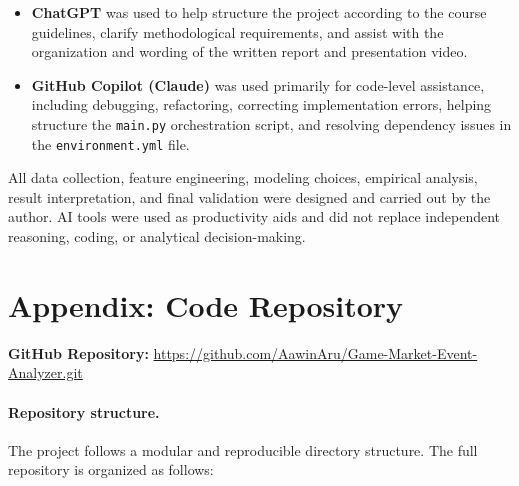 \documentclass[11pt,a4paper]{article}
\begin{document}
\begin{itemize}[itemsep=2pt]
\item \textbf{ChatGPT} was used to help structure the project according to the course guidelines, clarify methodological requirements, and assist with the organization and wording of the written report and presentation video.
\item \textbf{GitHub Copilot (Claude)} was used primarily for code-level assistance, including debugging, refactoring, correcting implementation errors, helping structure the \texttt{main.py} orchestration script, and resolving dependency issues in the \texttt{environment.yml} file.
\end{itemize}

All data collection, feature engineering, modeling choices, empirical analysis, result interpretation, and final validation were designed and carried out by the author. AI tools were used as productivity aids and did not replace independent reasoning, coding, or analytical decision-making.


\newpage
\appendix
\section{Appendix: Code Repository}
\label{app:code}

\noindent
\textbf{GitHub Repository:} \url{https://github.com/AawinAru/Game-Market-Event-Analyzer.git}

\paragraph{Repository structure.}

The project follows a modular and reproducible directory structure. The full repository is organized as follows:
\end{document}
